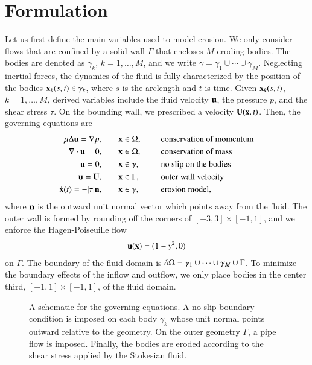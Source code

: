 \documentclass[preprint, 10pt]{elsarticle}
\begin{document}
\section{Formulation\label{s:formulation}} 
Let us first define the main variables used to model erosion.  We only
consider flows that are confined by a solid wall $\Gamma$ that encloses
$M$ eroding bodies.  The bodies are denoted as $\gamma_k$,
$k=1,\ldots,M$, and we write $\gamma = \gamma_1 \cup \cdots \cup
\gamma_M$.  Neglecting inertial forces, the dynamics of the fluid is
fully characterized by the position of the bodies ${\mathbf{x}}_k(s,t) \in
\gamma_k$, where $s$ is the arclength and $t$ is time.  Given
${\mathbf{x}}_k(s,t)$, $k=1,\ldots,M$, derived variables include the fluid
velocity ${\mathbf{u}}$, the pressure $p$, and the shear stress $\tau$.   On the
bounding wall, we prescribed a velocity ${\mathbf{U}}({\mathbf{x}},t)$.  Then, the
governing equations are
\begin{equation}
\label{eqn:erosionModel}
\begin{split}
  \mu \Delta {\mathbf{u}} = {\nabla} p, &\hspace{20pt} {\mathbf{x}} \in \Omega, \hspace*{.2in} &&\mbox{conservation
of momentum}\\
{\nabla} \cdot {\mathbf{u}} = 0, &\hspace{20pt} {\mathbf{x}} \in \Omega, \hspace*{.2in}
&&\mbox{conservation of mass} \\
{\mathbf{u}} = 0, &\hspace{20pt} {\mathbf{x}} \in \gamma, \hspace*{.2in} &&\mbox{no slip on the
bodies} \\
{\mathbf{u}} = {\mathbf{U}}, &\hspace{20pt} {\mathbf{x}} \in \Gamma, \hspace*{.2in} &&\mbox{outer wall
velocity} \\
\dot{{\mathbf{x}}}(t) = -|\tau| {\mathbf{n}}, &\hspace{20pt} {\mathbf{x}} \in \gamma,
&&\mbox{erosion model},
\end{split}
\end{equation}
where ${\mathbf{n}}$ is the outward unit normal vector which points away from the
fluid.  The outer wall is formed by rounding off the corners of $[-3,3]
\times [-1,1]$, and we enforce the Hagen-Poiseuille flow
\begin{align*}
  {\mathbf{u}}({\mathbf{x}}) = (1-y^2,0)
\end{align*}
on $\Gamma$.  The boundary of the fluid domain is ${\partial}\Omega = \gamma_1
\cup \cdots \cup \gamma_M \cup \Gamma$.  To minimize the boundary
effects of the inflow and outflow, we only place bodies in the center
third, $[-1,1] \times [-1,1]$, of the fluid domain.
\begin{figure}[htpb]
  \centering
  
  \caption{\label{fig:schematic} A schematic for the governing
    equations.  A no-slip boundary condition is imposed on each body
    $\gamma_k$ whose unit normal points outward relative to the
    geometry.  On the outer geometry $\Gamma$, a pipe flow is imposed.
    Finally, the bodies are eroded according to the shear stress applied
    by the Stokesian fluid.}
\end{figure}
\end{document}
